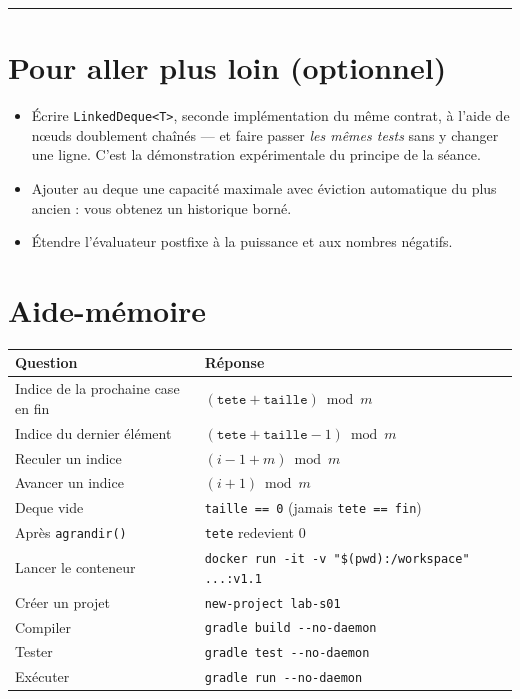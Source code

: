 \documentclass[11pt,a4paper]{article}
\newcommand{\lig}[1]{\rule{#1}{0.4pt}}
\begin{document}
\vspace{0.2cm}
\noindent\lig{14cm}

\newpage
\section*{Pour aller plus loin (optionnel)}

\begin{itemize}[nosep]
    \item Écrire \texttt{LinkedDeque<T>}, seconde implémentation du même
          contrat, à l'aide de nœuds doublement chaînés --- et faire passer
          \emph{les mêmes tests} sans y changer une ligne. C'est la
          démonstration expérimentale du principe de la séance.
    \item Ajouter au deque une capacité maximale avec éviction automatique
          du plus ancien : vous obtenez un historique borné.
    \item Étendre l'évaluateur postfixe à la puissance et aux nombres
          négatifs.
\end{itemize}

\section*{Aide-mémoire}

\begin{center}
\begin{tabular}{ll}
\toprule
\textbf{Question} & \textbf{Réponse} \\
\midrule
Indice de la prochaine case en fin & $(\texttt{tete} + \texttt{taille}) \bmod m$ \\
Indice du dernier élément & $(\texttt{tete} + \texttt{taille} - 1) \bmod m$ \\
Reculer un indice & $(i - 1 + m) \bmod m$ \\
Avancer un indice & $(i + 1) \bmod m$ \\
Deque vide & \texttt{taille == 0} (jamais \texttt{tete == fin}) \\
Après \texttt{agrandir()} & \texttt{tete} redevient $0$ \\
\midrule
Lancer le conteneur & \texttt{docker run -it -v "\$(pwd):/workspace" ...:v1.1} \\
Créer un projet & \texttt{new-project lab-s01} \\
Compiler & \texttt{gradle build -\/-no-daemon} \\
Tester & \texttt{gradle test -\/-no-daemon} \\
Exécuter & \texttt{gradle run -\/-no-daemon} \\
\bottomrule
\end{tabular}
\end{center}
\end{document}
